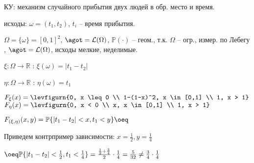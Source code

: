 \begin{example}
	КУ: механизм случайного прибытия двух людей в обр. место и время.
	
	исходы: $\omega = (t_1,t_2)$, $t_i$ -- время прибытия.
	
	$\Omega = \{\omega\} = [0,1]^2$, $\agot = \mathcal{L}(\Omega)$, 
	$\mathbb{P}(\cdot)$ -- геом., т.к. $\Omega$ -- огр., измер. по Лебегу
	, $\agot = \mathcal{L}(\Omega)$, исходы мелкие, неделимые.
	
	$\xi:\Omega \to \mathbb{R}$ : $\xi(\omega) = |t_1 - t_2|$
	
	$\eta:\Omega \to \mathbb{R}$ : $\eta(\omega) = t_1$
	
	$F_{\xi}(x) = \levfigurn{0, x \leq 0 \\ 1-(1-x)^2, x \in [0,1] \\ 1, x > 1}$
	$F_{\eta}(x) = \levfigurn{0, x < 0 \\ x, x \in [0,1] \\ 1, x > 1}$
	
	$F_{(\xi,\eta)}(x,y) = \mathbb{P}\{|t_1 - t_2| < x, t_1 < y\} \oeq$
	
	Приведем контрпример зависимости: $x = \frac{1}{2}, y = \frac{1}{4}$
	
	$\oeq \mathbb{P}\{|t_1 - t_2| < \frac{1}{2}, t_1 < \frac{1}{4}\} = \frac{\frac{1}{2} + \frac{3}{4}}{2} \cdot \frac{1}{4} = \frac{5}{32} \neq \frac{3}{4} \cdot \frac{1}{4}$
\end{example}



